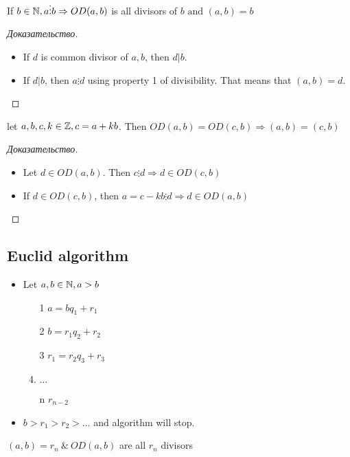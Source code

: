 \begin{property}[]
	If $b \in \mathbb{N}, a \vdots b \Rightarrow OD(a,b)$ is all divisors of $b \text{ and } (a,b) = b$
\end{property}

\begin{proof}[Доказательство]
	\begin{itemize}
		\item If $d$ is common divisor of $a,b$, then $d | b$.
		\item If $d | b$, then $a \vdots d$ using property 1 of divisibility. That means that $(a,b) = d$. 
	\end{itemize}
\end{proof}

\begin{property}[]
	let $a,b,c,k \in \mathbb{Z}, c = a + kb$. Then $OD(a,b) = OD(c,b) \Rightarrow (a,b) = (c,b)$

\end{property}

\begin{proof}[Доказательство]
	\begin{itemize}
		\item Let $d \in OD(a,b)$. Then $c \vdots d \Rightarrow d \in OD(c,b)$
		\item If $d \in OD(c,b)$, then $a = c - kb \vdots d \Rightarrow d \in OD(a,b)$ 
	\end{itemize}
\end{proof}

\subsection{Euclid algorithm}

\begin{itemize}
	\item Let $a,b \in \mathbb{N}, a > b$
		\begin{enumerate}
			\item [1] $a = bq_1 + r_1$
			\item [2] $b = r_1q_2 + r_2$
			\item [3] $r_1 = r_2q_3 + r_3$
			\item $ \dots $
			\item [n] $r_{n-2}$
		\end{enumerate}
	\item $b > r_1 > r_2 > \dots $ and algorithm will stop. 
\end{itemize}

\begin{theorem}[]
	$(a,b) = r_n \ \& \ OD(a,b)$ are all $r_n$ divisors
\end{theorem}

